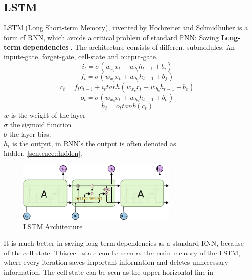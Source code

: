  \subsection{LSTM} \label{subsection::lstm}
  LSTM (Long Short-term Memory), invented by Hochreiter and Schmidhuber \cite{Hochreiter1997} is a form of RNN, which avoids a critical problem of standard RNN: Saving 
  \textbf{Long-term dependencies} 
  \cite{Goodfellow2016}.
  The architecture consists of different submodules: An inpute-gate, forget-gate, cell-state and output-gate.
  \begin{equation}
   i_t = \sigma(w_{x_i}x_t + w_{h_i}h_{t-1} + b_i)
  \end{equation}
  \begin{equation}
   f_t = \sigma(w_{x_f}x_t + w_{h_f}h_{t-1} + b_f)
  \end{equation}
  \begin{equation}
   c_t = f_tc_{t-1} + i_ttanh(w_{x_c}x_t + w_{h_c}h_{t-1} + b_c)
  \end{equation}
  \begin{equation}
   o_t = \sigma(w_{x_o}x_t + w_{h_o}h_{t-1} + b_o)
  \end{equation}
  \begin{equation}
   h_t = o_ttanh(c_t)
  \end{equation}
  $w$ is the weight of the layer\\
  $\sigma$ the sigmoid function\\
  $b$ the layer bias.\\
  $h_t$ is the output, in RNN's the output is often denoted as hidden~\ref{sentence::hidden}.
  \begin{figure}[H]
   \includegraphics[width=0.7\textwidth]{../Images/lstm_chain.png}
   \centering
   \caption{LSTM Architecture \cite{Olah2015}}
   \label{fig:lstm_architecture}
  \end{figure}\noindent
  It is much better in saving long-term dependencies as a standard RNN, because of the cell-state. This cell-state can be seen as the main memory of the LSTM,
  where every iteration saves important information and deletes unnecessary information. The cell-state can be seen as the upper horizontal line in 
